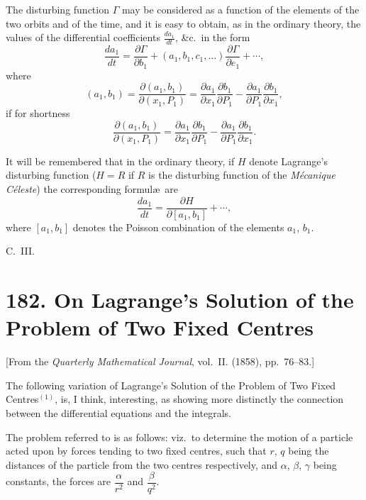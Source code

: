 \documentclass[12pt,a4paper]{article}
\theoremstyle{plain}
\theoremstyle{definition}
\begin{document}
The disturbing function $\Gamma$ may be considered as a function of the elements of the two orbits and of the time, and it is easy to obtain, as in the ordinary theory, the values of the differential coefficients $\frac{da_1}{dt}$, \&c.\ in the form
\[
\frac{da_1}{dt} = \frac{\partial \Gamma}{\partial b_1} + (a_1, b_1, c_1, \ldots)\frac{\partial \Gamma}{\partial e_1} + \cdots,
\]
where
\[
(a_1, b_1) = \frac{\partial (a_1, b_1)}{\partial (x_1, P_1)} = \frac{\partial a_1}{\partial x_1}\frac{\partial b_1}{\partial P_1} - \frac{\partial a_1}{\partial P_1}\frac{\partial b_1}{\partial x_1},
\]
if for shortness
\[
\frac{\partial (a_1, b_1)}{\partial (x_1, P_1)} = \frac{\partial a_1}{\partial x_1}\frac{\partial b_1}{\partial P_1} - \frac{\partial a_1}{\partial P_1}\frac{\partial b_1}{\partial x_1}.
\]

It will be remembered that in the ordinary theory, if $H$ denote Lagrange's disturbing function ($H = R$ if $R$ is the disturbing function of the \textit{M\'{e}canique C\'{e}leste}) the corresponding formul\ae\ are
\[
\frac{da_1}{dt} = \frac{\partial H}{\partial [a_1, b_1]} + \cdots,
\]
where $[a_1, b_1]$ denotes the Poisson combination of the elements $a_1$, $b_1$.

\begin{flushright}
C.~III.
\end{flushright}


\newpage
\section*{182. On Lagrange's Solution of the Problem of Two Fixed Centres}

[From the \textit{Quarterly Mathematical Journal}, vol.~II. (1858), pp.~76--83.]

The following variation of Lagrange's Solution of the Problem of Two Fixed Centres$^{(1)}$, is, I think, interesting, as showing more distinctly the connection between the differential equations and the integrals.

The problem referred to is as follows: viz.\ to determine the motion of a particle acted upon by forces tending to two fixed centres, such that $r$, $q$ being the distances of the particle from the two centres respectively, and $\alpha$, $\beta$, $\gamma$ being constants, the forces are $\dfrac{\alpha}{r^2}$ and $\dfrac{\beta}{q^2}$.
\end{document}
